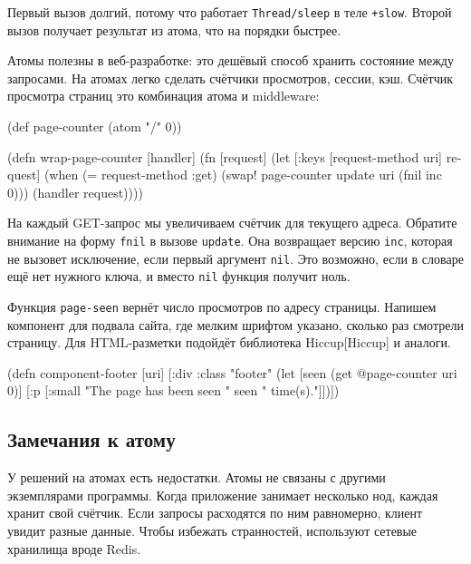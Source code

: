 
Первый вызов долгий, потому что работает \verb|Thread/sleep| в теле
\verb|+slow|. Второй вызов получает результат из атома, что на порядки
быстрее.


Атомы полезны в веб-разработке: это дешёвый способ хранить состояние между
запросами. На атомах легко сделать счётчики просмотров, сессии, кэш. Счётчик
просмотра страниц это комбинация атома и middleware:

\begin{english}
  \begin{clojure}
(def page-counter
  (atom {"/" 0}))

(defn wrap-page-counter
  [handler]
  (fn [request]
    (let [{:keys [request-method uri]} request]
      (when (= request-method :get)
        (swap! page-counter update uri (fnil inc 0)))
      (handler request))))
  \end{clojure}
\end{english}


На каждый GET-запрос мы увеличиваем счётчик для текущего адреса. Обратите
внимание на форму \verb|fnil| в вызове \verb|update|. Она возвращает версию
\verb|inc|, которая не вызовет исключение, если первый аргумент
\verb|nil|. Это возможно, если в словаре ещё нет нужного ключа, и вместо
\verb|nil| функция получит ноль.


Функция \verb|page-seen| вернёт число просмотров по адресу страницы. Напишем
компонент для подвала сайта, где мелким шрифтом указано, сколько раз смотрели
страницу. Для HTML-разметки подойдёт библиотека
Hiccup[Hiccup] и аналоги.

\begin{english}
  \begin{clojure}
(defn component-footer [uri]
  [:div {:class "footer"}
   (let [seen (get @page-counter uri 0)]
     [:p [:small "The page has been seen " seen " time(s)."]])])
  \end{clojure}
\end{english}

\subsection{Замечания к атому}

У решений на атомах есть недостатки. Атомы не связаны с другими экземплярами
программы. Когда приложение занимает несколько нод, каждая хранит свой
счётчик. Если запросы расходятся по ним равномерно, клиент увидит разные
данные. Чтобы избежать странностей, используют сетевые хранилища вроде Redis.

